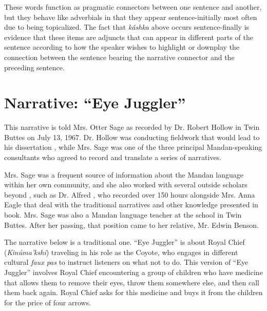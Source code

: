 These words function as pragmatic connectors between one sentence and another, but they behave like adverbials in that they appear sentence-initially most often due to being topicalized. The fact that \textit{káshka} above occurs sentence-finally is evidence that these items are adjuncts that can appear in different parts of the sentence according to how the speaker wishes to highlight or downplay the connection between the sentence bearing the narrative connector and the preceding sentence.


\section{Narrative: ``Eye Juggler''}\label{Ch6EyeJuggler}

This narrative is told Mrs. Otter Sage as recorded by Dr. Robert Hollow in Twin Buttes on July 13, 1967. Dr. Hollow was conducting fieldwork that would lead to his dissertation \citep{hollow1970}, while Mrs. Sage was one of the three principal Mandan-speaking consultants who agreed to record and translate a series of narratives. 

Mrs. Sage was a frequent source of information about the Mandan language within her own community, and she also worked with several outside scholars beyond \citet{hollow1970,hollow1973a,hollow1973b}, such as Dr. Alfred \citet{bowers1971}, who recorded over 150 hours alongside Mrs. Anna Eagle that deal with the traditional narratives and other knowledge presented in  book. Mrs. Sage was also a Mandan language teacher at the school in Twin Buttes. After her passing, that position came to her relative, Mr. Edwin Benson.

The narrative below is a traditional one. ``Eye Juggler'' is about Royal Chief (\textit{Kinúma'kshi}) traveling in his role as the Coyote, who engages in different cultural \textit{faux pas} to instruct listeners on what not to do. This version of ``Eye Juggler'' involves Royal Chief encountering a group of children who have medicine that allows them to remove their eyes, throw them somewhere else, and then call them back again. Royal Chief asks for this medicine and buys it from the children for the price of four arrows. 

